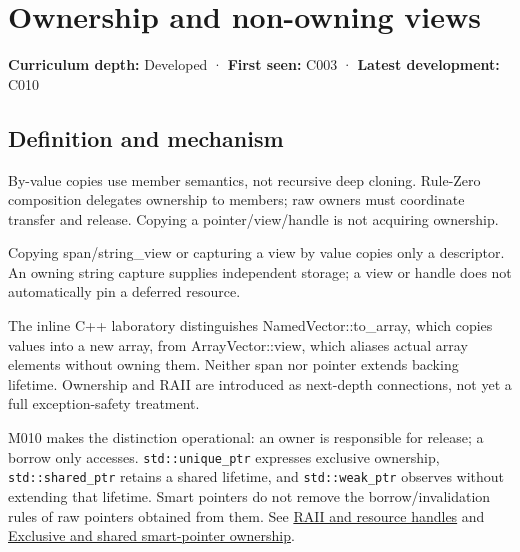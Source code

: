 \hypertarget{appendix-d52e4486f527}{}\label{referencestart:appendix-d52e4486f527}
\section{Ownership and non-owning views}\label{appendix-d52e4486f527-ownership-and-non-owning-views}

\hypertarget{appendix-d52e4486f527-ownership-and-non-owning-views}{}

\textbf{Curriculum depth:} Developed · \textbf{First seen:} C003 · \textbf{Latest development:} C010

\begin{allmightroledefinition}

\subsection{Definition and mechanism}\label{appendix-d52e4486f527-definition-and-mechanism}

\hypertarget{appendix-d52e4486f527-definition-and-mechanism}{}

By-value copies use member semantics, not recursive deep cloning. Rule-Zero composition delegates ownership to members; raw owners must coordinate transfer and release. Copying a pointer/view/handle is not acquiring ownership.

\end{allmightroledefinition}

Copying span/string\_view or capturing a view by value copies only a descriptor. An owning string capture supplies independent storage; a view or handle does not automatically pin a deferred resource.

The inline C++ laboratory distinguishes NamedVector::to\_array, which copies values into a new array, from ArrayVector::view, which aliases actual array elements without owning them. Neither span nor pointer extends backing lifetime. Ownership and RAII are introduced as next-depth connections, not yet a full exception-safety treatment.

M010 makes the distinction operational: an owner is responsible for release; a borrow only accesses. \texttt{std::unique\_ptr} expresses exclusive ownership, \texttt{std::shared\_ptr} retains a shared lifetime, and \texttt{std::weak\_ptr} observes without extending that lifetime. Smart pointers do not remove the borrow/invalidation rules of raw pointers obtained from them. See \hyperref[appendix-69739d3ab49b]{RAII and resource handles} and \hyperref[appendix-51602cabe815]{Exclusive and shared smart-pointer ownership}.


